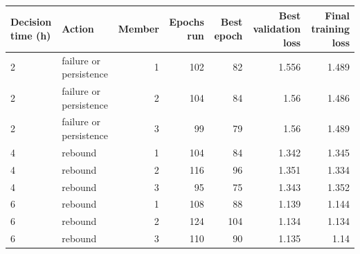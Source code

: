 \begin{tabular}{llrrrrr}
\toprule
Decision time (h) & Action & Member & Epochs run & Best epoch & Best validation loss & Final training loss \\
\midrule
2 & failure or persistence & 1 & 102 & 82 & 1.556 & 1.489 \\
2 & failure or persistence & 2 & 104 & 84 & 1.56 & 1.486 \\
2 & failure or persistence & 3 & 99 & 79 & 1.56 & 1.489 \\
4 & rebound & 1 & 104 & 84 & 1.342 & 1.345 \\
4 & rebound & 2 & 116 & 96 & 1.351 & 1.334 \\
4 & rebound & 3 & 95 & 75 & 1.343 & 1.352 \\
6 & rebound & 1 & 108 & 88 & 1.139 & 1.144 \\
6 & rebound & 2 & 124 & 104 & 1.134 & 1.134 \\
6 & rebound & 3 & 110 & 90 & 1.135 & 1.14 \\
\bottomrule
\end{tabular}
